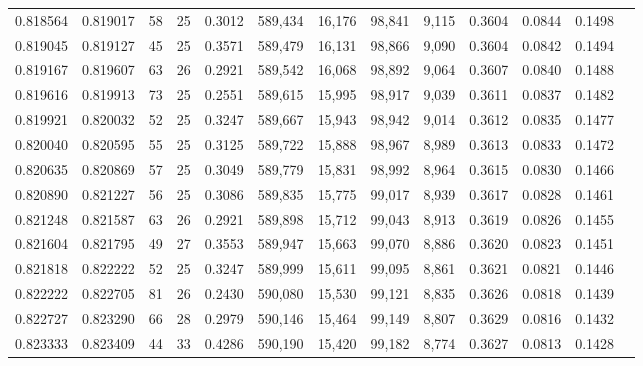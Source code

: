 \begin{tabular}{rrrrrrrrrrrrr}
0.818564 & 0.819017 &     58 &    25 &                                     0.3012 & 589,434 &  16,176 &  98,841 &   9,115 & 0.3604 & 0.0844 & 0.1498 \\
0.819045 & 0.819127 &     45 &    25 &                                     0.3571 & 589,479 &  16,131 &  98,866 &   9,090 & 0.3604 & 0.0842 & 0.1494 \\
0.819167 & 0.819607 &     63 &    26 &                                     0.2921 & 589,542 &  16,068 &  98,892 &   9,064 & 0.3607 & 0.0840 & 0.1488 \\
0.819616 & 0.819913 &     73 &    25 &                                     0.2551 & 589,615 &  15,995 &  98,917 &   9,039 & 0.3611 & 0.0837 & 0.1482 \\
0.819921 & 0.820032 &     52 &    25 &                                     0.3247 & 589,667 &  15,943 &  98,942 &   9,014 & 0.3612 & 0.0835 & 0.1477 \\
0.820040 & 0.820595 &     55 &    25 &                                     0.3125 & 589,722 &  15,888 &  98,967 &   8,989 & 0.3613 & 0.0833 & 0.1472 \\
0.820635 & 0.820869 &     57 &    25 &                                     0.3049 & 589,779 &  15,831 &  98,992 &   8,964 & 0.3615 & 0.0830 & 0.1466 \\
0.820890 & 0.821227 &     56 &    25 &                                     0.3086 & 589,835 &  15,775 &  99,017 &   8,939 & 0.3617 & 0.0828 & 0.1461 \\
0.821248 & 0.821587 &     63 &    26 &                                     0.2921 & 589,898 &  15,712 &  99,043 &   8,913 & 0.3619 & 0.0826 & 0.1455 \\
0.821604 & 0.821795 &     49 &    27 &                                     0.3553 & 589,947 &  15,663 &  99,070 &   8,886 & 0.3620 & 0.0823 & 0.1451 \\
0.821818 & 0.822222 &     52 &    25 &                                     0.3247 & 589,999 &  15,611 &  99,095 &   8,861 & 0.3621 & 0.0821 & 0.1446 \\
0.822222 & 0.822705 &     81 &    26 &                                     0.2430 & 590,080 &  15,530 &  99,121 &   8,835 & 0.3626 & 0.0818 & 0.1439 \\
0.822727 & 0.823290 &     66 &    28 &                                     0.2979 & 590,146 &  15,464 &  99,149 &   8,807 & 0.3629 & 0.0816 & 0.1432 \\
0.823333 & 0.823409 &     44 &    33 &                                     0.4286 & 590,190 &  15,420 &  99,182 &   8,774 & 0.3627 & 0.0813 & 0.1428 \\

\end{tabular}
